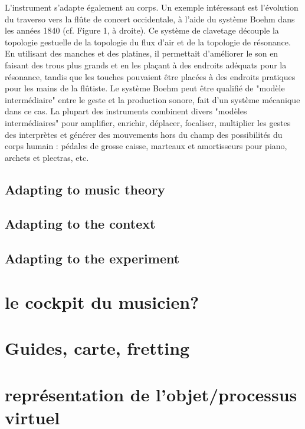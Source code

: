 L'instrument s'adapte également au corps. Un exemple intéressant est l'évolution du traverso vers la flûte de concert occidentale, à l'aide du système Boehm dans les années 1840 (cf. Figure 1, à droite). Ce système de clavetage découple la topologie gestuelle de la topologie du flux d'air et de la topologie de résonance. En utilisant des manches et des platines, il permettait d'améliorer le son en faisant des trous plus grands et en les plaçant à des endroits adéquats pour la résonance, tandis que les touches pouvaient être placées à des endroits pratiques pour les mains de la flûtiste.
Le système Boehm peut être qualifié de "modèle intermédiaire" entre le geste et la production sonore, fait d'un système mécanique dans ce cas. La plupart des instruments combinent divers "modèles intermédiaires" pour amplifier, enrichir, déplacer, focaliser, multiplier les gestes des interprètes et générer des mouvements hors du champ des possibilités du corps humain : pédales de grosse caisse, marteaux et amortisseurs pour piano, archets et plectras, etc.

\subsection{Adapting to music theory}
\subsection{Adapting to the context}
\subsection{Adapting to the experiment}



\section{le cockpit du musicien?}
\label{sec:visual_representation:sec1}

\section{Guides, carte, fretting}

\section{représentation de l'objet/processus virtuel}


